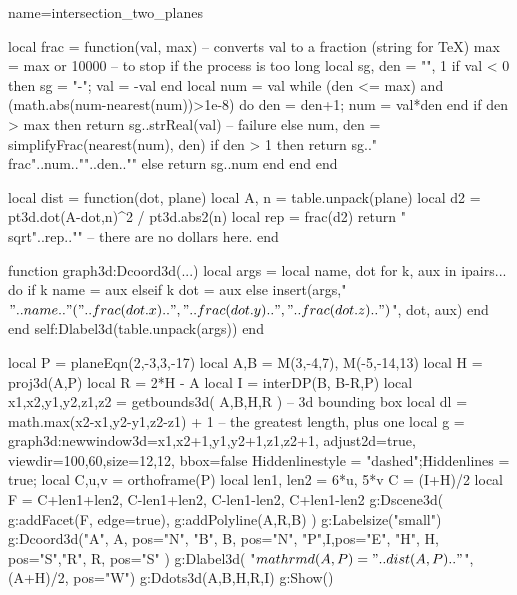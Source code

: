 \documentclass[12pt]{standalone}%
\begin{document}
\begin{luadraw}{name=intersection_two_planes}

local frac = function(val, max)  -- converts val to a fraction (string for TeX)
    max = max or 10000 -- to stop if the process is too long
    local sg, den =  "", 1
    if val < 0 then sg = "-"; val = -val end
    local num = val
    while (den <= max) and (math.abs(num-nearest(num))>1e-8) do den = den+1; num = val*den end
    if den > max then 
        return sg..strReal(val) -- failure
    else
        num, den = simplifyFrac(nearest(num), den)
        if den > 1 then 
            return sg.."\\frac{"..num.."}{"..den.."}"
        else
            return sg..num
        end
    end
end

local dist = function(dot, plane)
    local A, n = table.unpack(plane)
    local d2 = pt3d.dot(A-dot,n)^2 / pt3d.abs2(n)
    local rep = frac(d2)
    return "\\sqrt{"..rep.."}" -- there are no dollars here.
end

function graph3d:Dcoord3d(...)
    local args = {}
    local name, dot
    for k, aux in ipairs{...} do
        if k%
            name = aux
        elseif k%
            dot = aux
        else
            insert(args,{"$"..name.."("..frac(dot.x)..","..frac(dot.y)..","..frac(dot.z)..")$", dot, aux})
        end
    end
    self:Dlabel3d(table.unpack(args))
end

local P = planeEqn(2,-3,3,-17)
local A,B = M(3,-4,7), M(-5,-14,13)
local H = proj3d(A,P)
local R = 2*H - A
local I = interDP({B, B-R},P)
local x1,x2,y1,y2,z1,z2 = getbounds3d( {A,B,H,R} ) -- 3d bounding box
local dl = math.max(x2-x1,y2-y1,z2-z1) + 1 -- the greatest length, plus one
local g = graph3d:new{window3d={x1,x2+1,y1,y2+1,z1,z2+1}, adjust2d=true, viewdir={100,60},size={12,12}, bbox=false}
Hiddenlinestyle = "dashed";Hiddenlines = true;
local C,u,v = orthoframe(P)
local len1, len2 = 6*u, 5*v
C = (I+H)/2
local F = {C+len1+len2, C-len1+len2, C-len1-len2, C+len1-len2}
g:Dscene3d(
    g:addFacet(F, {edge=true}),
    g:addPolyline({{A,R,B}})
)
g:Labelsize("small")
g:Dcoord3d("A", A, {pos="N"}, "B", B, {pos="N"}, "P",I,{pos="E"}, "H", H, {pos="S"},"R", R, {pos="S"} )
g:Dlabel3d( "$\\mathrm d(A,P)="..dist(A,P).."$", (A+H)/2, {pos="W"})
g:Ddots3d({A,B,H,R,I})
g:Show()
\end{luadraw} 
\end{document}

